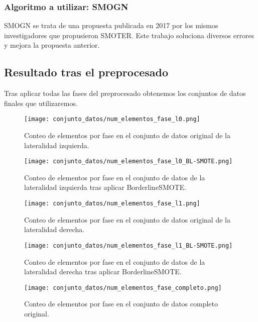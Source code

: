\subsubsection{Algoritmo a utilizar: SMOGN}

SMOGN \cite{SMOGN} se trata de una propuesta publicada en 2017 por los mismos investigadores que propusieron SMOTER. Este trabajo soluciona diversos errores y mejora la propuesta anterior.


\newpage

\subsection{Resultado tras el preprocesado}

Tras aplicar todas las fases del preprocesado obtenemos los conjuntos de datos finales que utilizaremos.

\begin{figure}[H]
    \centering
	  \texttt{[image: conjunto\_datos/num\_elementos\_fase\_l0.png]}
    \caption{Conteo de elementos por fase en el conjunto de datos original de la lateralidad izquierda.}
	 \label{fig:l0-orig}
\end{figure}

\begin{figure}[H]
    \centering
     \texttt{[image: conjunto\_datos/num\_elementos\_fase\_l0\_BL-SMOTE.png]}
    \caption{Conteo de elementos por fase en el conjunto de datos de la lateralidad izquierda tras aplicar BorderlineSMOTE.}
	 \label{fig:l0-over}
\end{figure}

\begin{figure}[H]
    \centering
	  \texttt{[image: conjunto\_datos/num\_elementos\_fase\_l1.png]}
    \caption{Conteo de elementos por fase en el conjunto de datos original de la lateralidad derecha.}
	 \label{fig:l1-orig}
\end{figure}

\begin{figure}[H]
    \centering
     \texttt{[image: conjunto\_datos/num\_elementos\_fase\_l1\_BL-SMOTE.png]}
    \caption{Conteo de elementos por fase en el conjunto de datos de la lateralidad derecha tras aplicar BorderlineSMOTE.}
	 \label{fig:l1-over}
\end{figure}



\begin{figure}[H]
    \centering
	  \texttt{[image: conjunto\_datos/num\_elementos\_fase\_completo.png]}
     \label{fig:completo-orig}
    \caption{Conteo de elementos por fase en el conjunto de datos completo original.}

\end{figure}


